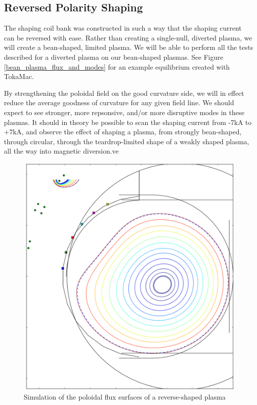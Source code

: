 \documentclass[aps,prl,twocolumn,superscriptaddress,groupedaddress]{revtex4}  %
\begin{document}
\subsection{Reversed Polarity Shaping}
The shaping coil bank was constructed in such a way that the shaping current can be reversed with ease.  Rather than creating a single-null, diverted plasma, we will create a bean-shaped, limited plasma.  We will be able to perform all the tests described for a diverted plasma on our bean-shaped plasmas.  See Figure \ref{bean_plasma_flux_and_modes} for an example equilibrium created with TokaMac.\par
By strengthening the poloidal field on the good curvature side, we will in effect reduce the average goodness of curvature for any given field line.  We should expect to see stronger, more repsonsive, and/or more disruptive modes in these plasmas.  It should in theory be possible to scan the shaping current from -7kA to +7kA, and observe the effect of shaping a plasma, from strongly bean-shaped, through circular, through the teardrop-limited shape of a weakly shaped plasma, all the way into magnetic diversion.ve 
\begin{figure}[htb]
	\centering
\includegraphics[scale=.22]{../Plots/bean_plasma_flux_and_currents_85385_90cm_250kPA_neg7kSH_cropped.png}\caption{Simulation of the poloidal flux surfaces of a reverse-shaped plasma}
	\label{nat_mode_sim_v_meas}
	\end{figure}
\end{document}
